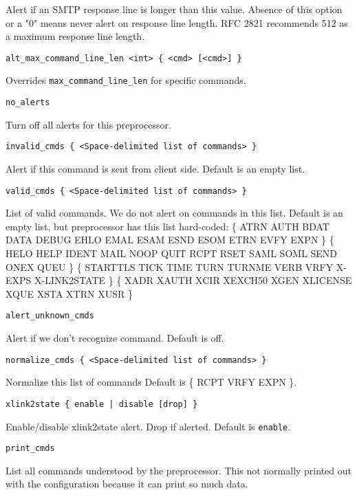 \documentclass[english]{report}
\newcounter{slistnum}
\newenvironment{slist}
{ \begin{list}{ {\bf \arabic{slistnum}.} }{\usecounter{slistnum} } }
{ \end{list} }
\begin{document}
\begin{slist}
Alert if an SMTP response line is longer than this value.  Absence of this
option or a "0" means never alert on response line length.
RFC 2821 recommends 512 as a maximum response line length.

\item \texttt{alt\_max\_command\_line\_len <int> \{ <cmd> [<cmd>] \}}

Overrides \texttt{max\_command\_line\_len} for specific commands.

\item \texttt{no\_alerts}

Turn off all alerts for this preprocessor.

\item \texttt{invalid\_cmds \{ <Space-delimited list of commands> \}}

Alert if this command is sent from client side.
Default is an empty list.

\item \texttt{valid\_cmds \{ <Space-delimited list of commands> \}}

List of valid commands.  We do not alert on commands in this list.
Default is an empty list, but preprocessor has this list hard-coded:
\{ ATRN AUTH BDAT DATA DEBUG EHLO EMAL ESAM ESND ESOM ETRN EVFY EXPN \}
\{ HELO HELP IDENT MAIL NOOP QUIT RCPT RSET SAML SOML SEND ONEX QUEU \}
\{ STARTTLS TICK TIME TURN TURNME VERB VRFY X-EXPS X-LINK2STATE \}
\{ XADR XAUTH XCIR XEXCH50 XGEN XLICENSE XQUE XSTA XTRN XUSR  \}

\item \texttt{alert\_unknown\_cmds}

Alert if we don't recognize command.  Default is off.

\item \texttt{normalize\_cmds \{ <Space-delimited list of commands> \}}

Normalize this list of commands Default is \{ RCPT VRFY EXPN \}.

\item \texttt{xlink2state \{ enable | disable [drop] \}}

Enable/disable xlink2state alert.  Drop if alerted.  Default is \texttt{enable}.

\item \texttt{print\_cmds}

List all commands understood by the preprocessor.  This not normally
printed out with the configuration because it can print so much data.

\end{slist}
\end{document}
